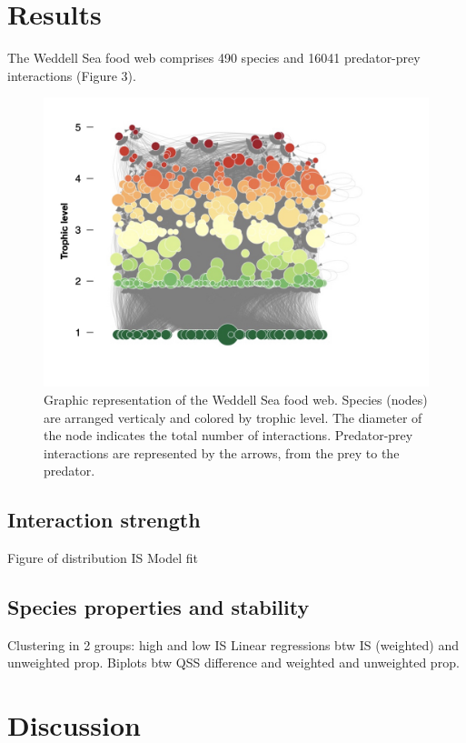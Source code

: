 \documentclass[gc, manuscript]{copernicus}
\begin{document}
\section{Results}

The Weddell Sea food web comprises 490 species and 16041 predator-prey
interactions (Figure 3).

\begin{figure}
\includegraphics[width=12cm]{WeddellSea_net} \caption{Graphic representation of the Weddell Sea food web. Species (nodes) are arranged verticaly and colored by trophic level. The diameter of the node indicates the total number of interactions. Predator-prey interactions are represented by the arrows, from the prey to the predator.}\label{fig:unnamed-chunk-3}
\end{figure}

\subsection{Interaction strength}

Figure of distribution IS Model fit

\subsection{Species properties and stability}

Clustering in 2 groups: high and low IS Linear regressions btw IS
(weighted) and unweighted prop. Biplots btw QSS difference and weighted
and unweighted prop.

\section{Discussion}
\end{document}
